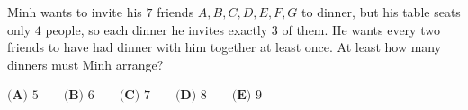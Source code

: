 Minh wants to invite his $7$ friends $A,B,C,D,E,F,G$ to dinner, but his table seats only $4$ people, so each dinner he invites exactly $3$ of them. He wants every two friends to have had dinner with him together at least once. At least how many dinners must Minh arrange?

$\textbf{(A) } 5\qquad\textbf{(B) } 6\qquad\textbf{(C) } 7\qquad\textbf{(D) } 8\qquad\textbf{(E) } 9$
